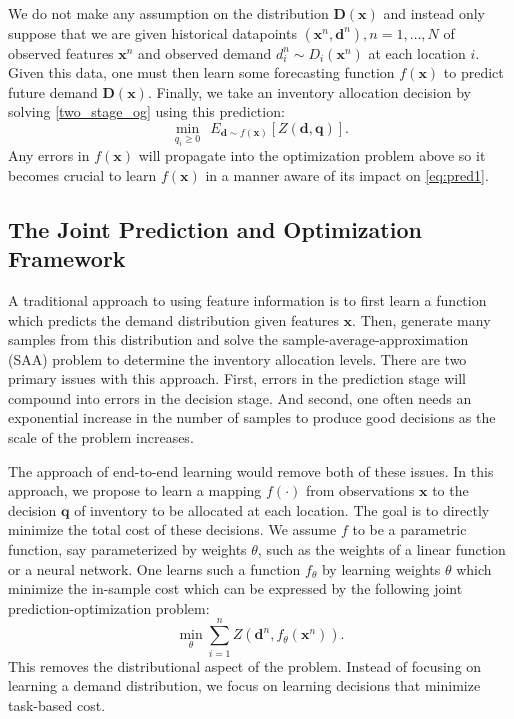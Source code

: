 \documentclass[poms,final,blindrev]{poms1_V1} %
\newcommand{\x}[0]{{\mathbf{x}}}
\newcommand{\q}[0]{{\mathbf{q}}}
\newcommand{\D}[0]{{\mathbf{D}}}
\newcommand{\dd}[0]{{\mathbf{d}}}
\begin{document}
We do not make any assumption on the distribution $\mathbf{D}(\x)$ and instead only suppose that we are given historical datapoints $(\x^n, \dd^n), n = 1, \dots, N$ of observed features $\x^n$ and observed demand $d^n_i \sim {D}_i(\x^n)$ at each location $i$. Given this data, one must then learn some forecasting function $f(\x)$ to predict future demand $\D(\x)$. Finally, we take an inventory allocation decision by solving \eqref{two_stage_og} using this prediction:
\begin{equation}
\label{eq:pred1}
    \min_{q_i \geq 0} \ \  E_{\dd \sim f(\x)}[Z({\dd},{\q})].
\end{equation}
Any errors in $f(\x)$ will propagate into the optimization problem above so it becomes crucial to learn $f(\x)$ in a manner aware of its impact on \eqref{eq:pred1}.

\subsection{The Joint Prediction and Optimization Framework}

A traditional approach to using feature information is to first learn a function which predicts the demand distribution given features $\x$. Then, generate many samples from this distribution and solve the sample-average-approximation (SAA) problem to determine the inventory allocation levels. There are two primary issues with this approach. First, errors in the prediction stage will compound into errors in the decision stage. And second, one often needs an exponential increase in the number of samples to produce good decisions as the scale of the problem increases.

The approach of end-to-end learning would remove both of these issues. In this approach, we propose to learn a mapping $f(\cdot)$ from observations $\x$ to the decision $\q$ of inventory to be allocated at each location. The goal is to directly minimize the total cost of these decisions. We assume $f$ to be a parametric function, say parameterized by weights $\theta$, such as the weights of a linear function or a neural network. One learns such a function $f_\theta$ by learning weights $\theta$ which minimize the in-sample cost which can be expressed by the following joint prediction-optimization problem:
\begin{equation}
    \min_{\theta} \sum_{i = 1}^n Z(\dd^n, f_\theta(\x^n)).
\end{equation}
This removes the distributional aspect of the problem. Instead of focusing on learning a demand distribution, we focus on learning decisions that minimize task-based cost.
\end{document}
